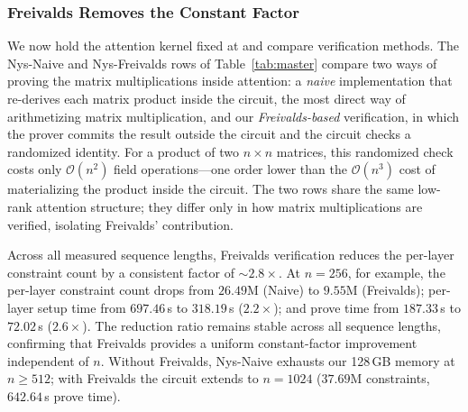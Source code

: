 \documentclass[sigconf,anonymous,review,balance=false]{acmart}
\newcommand{\rev}[1]{{\color{magenta}#1}}
\begin{document}
\subsubsection{Freivalds Removes the Constant Factor}
\label{subsec:freivalds-benefit}
We now hold the attention kernel fixed at \nystrom and compare verification methods. The Nys-Naive and Nys-Freivalds rows of Table~\ref{tab:master} compare two ways of proving the matrix multiplications inside \nystrom attention: a \emph{naive} implementation that re-derives each matrix product inside the circuit, the most direct way of arithmetizing matrix multiplication, and our \emph{Freivalds-based} verification, in which the prover commits the result outside the circuit and the circuit checks a randomized identity. For a product of two $n{\times}n$ matrices, this randomized check costs only $\mathcal{O}(n^2)$ field operations---one order lower than the $\mathcal{O}(n^3)$ cost of materializing the product inside the circuit. The two rows share the same low-rank attention structure; they differ only in how matrix multiplications are verified, isolating Freivalds' contribution.

Across all measured sequence lengths, Freivalds verification reduces the \nystrom per-layer constraint count by a consistent factor of ${\sim}2.8{\times}$. At $n{=}256$, for example, the per-layer constraint count drops from $26.49$M (Naive) to $9.55$M (Freivalds); per-layer setup time from \rev{$697.46$}\,s to \rev{$318.19$}\,s ($2.2{\times}$); and prove time from \rev{$187.33$}\,s to \rev{$72.02$}\,s ($2.6{\times}$). The reduction ratio remains stable across all sequence lengths, confirming that Freivalds provides a uniform constant-factor improvement independent of $n$. Without Freivalds, \rev{Nys-Naive} exhausts our 128\,GB memory at $n{\geq}512$; with Freivalds the circuit extends to $n{=}1024$ ($37.69$M constraints, \rev{$642.64$}\,s prove time).

\end{document}
